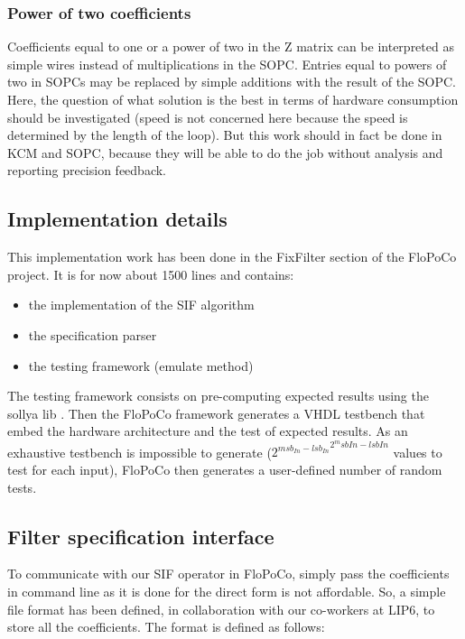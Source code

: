 	\subsubsection{Power of two coefficients}
		Coefficients equal to one or a power of two in the Z matrix can be interpreted as simple wires instead of multiplications in the SOPC.
		Entries equal to powers of two in SOPCs may be replaced by simple additions with the result of the SOPC.
		Here, the question of what solution is the best in terms of hardware consumption should be investigated
		(speed is not concerned here because the speed is determined by the length of the loop).
		But this work should in fact be done in KCM and SOPC, because they will be able to do the job without analysis and reporting precision feedback.

	\subsection{Implementation details}
	This implementation work has been done in the FixFilter section of the FloPoCo project.
	It is for now about 1500 lines and contains:
	\begin{itemize}
		\item the implementation of the SIF algorithm \vspace{-8pt}
		\item the specification parser \vspace{-8pt}
		\item the testing framework (emulate method)
	\end{itemize}

	The testing framework consists on pre-computing expected results using the sollya lib \cite{ChevillardJoldesLauter2010}.
	Then the FloPoCo framework generates a VHDL testbench that embed the hardware architecture and the test of expected results.
	As an exhaustive testbench is impossible to generate (${2^{msb_{In} - lsb_{In}}}^{2^msb{In} - lsb{In}}$ values to test for each input),
	FloPoCo then generates a user-defined number of random tests.

		\subsection{Filter specification interface}
		To communicate with our SIF operator in FloPoCo, simply pass the coefficients in command line as it is done for the direct form is not affordable.
		So, a simple file format has been defined, in collaboration with our co-workers at LIP6, to store all the coefficients.
		The format is defined as follows:

